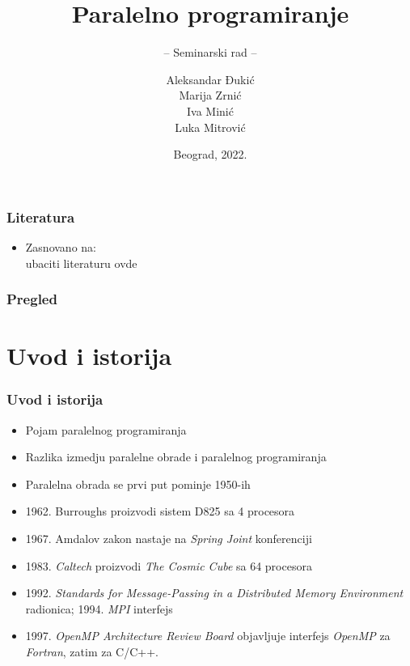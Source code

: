 \documentclass{beamer}
\title{Paralelno programiranje}
\subtitle{-- Seminarski rad --}
\author{Aleksandar Đukić \\Marija Zrnić \\Iva Minić \\Luka Mitrović}
\institute{Matematički fakultet\\Univerzitet u Beogradu}
\date{
	\footnotesize{Beograd, 2022.}	
}
\begin{document}
	\begin{frame}
		\thispagestyle{empty}
		\titlepage
	\end{frame}
	
	\addtocounter{framenumber}{-1}
	
	\begin{frame}[fragile]\frametitle{Literatura}
		\begin{itemize}
			\item Zasnovano na:\\
			ubaciti literaturu ovde
		\end{itemize}
	\end{frame}
	
	\begin{frame}
		\frametitle{Pregled}
		\tableofcontents[hidesubsections] 
	\end{frame}
	
	\section{Uvod i istorija}
	
	\begin{frame}[fragile]\frametitle{Uvod i istorija}
		\begin{itemize}	
			\item Pojam paralelnog programiranja
			\item Razlika izmedju paralelne obrade i paralelnog programiranja
			\bigskip
			\item Paralelna obrada se prvi put pominje 1950-ih
			\item 1962. Burroughs proizvodi sistem D825 sa 4 procesora
			\item 1967. Amdalov zakon nastaje na \emph{Spring Joint} konferenciji
			\item 1983. \emph{Caltech} proizvodi \emph{The Cosmic Cube} sa 64 procesora
			\bigskip
			\item 1992. \emph{Standards for Message-Passing in a Distributed Memory Environment} radionica; 1994. \emph{MPI} interfejs
			\item 1997. \emph{OpenMP Architecture Review Board} objavljuje interfejs \emph{OpenMP} za \emph{Fortran}, zatim za C/C++.
		\end{itemize}
	\end{frame}
	
	
\end{document}
